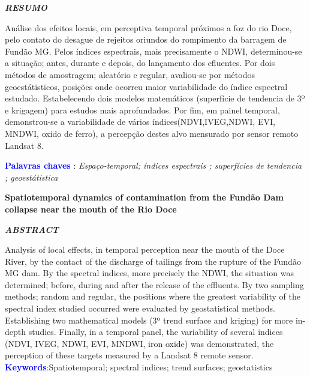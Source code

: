 \begin{center}
	\textbf{\textit{RESUMO}}
\end{center}
\noindent Análise dos efeitos locais, em perceptiva temporal  próximos a foz do rio Doce, pelo contato do desague de rejeitos oriundos do rompimento da barragem de Fundão MG. Pelos índices espectrais, mais precisamente o NDWI, determinou-se  a situação; antes, durante e depois, do lançamento dos efluentes. Por dois métodos de amostragem; aleatório e regular, avaliou-se por métodos geoestátisticos, posições onde ocorreu maior variabilidade do índice espectral estudado. Estabelecendo dois modelos matemáticos (superfície de tendencia de 3º e krigagem) para estudos mais aprofundados. Por fim, em painel temporal, demonstrou-se a variabilidade de vários índices(NDVI,IVEG,NDWI, EVI, MNDWI, oxido de ferro), a percepção destes alvo mensurado por sensor remoto Landsat 8. 

\noindent \textbf{\textcolor{blue}{Palavras chaves}  }:  \textit{ Espaço-temporal; índices espectrais  ;  superfícies de tendencia ; geoestátistica }

\begin{center}
\textbf{Spatiotemporal dynamics of contamination from the Fundão Dam collapse near the mouth of the Rio Doce}
\end{center}
\begin{center}
	\textbf{\textit{ABSTRACT}}
\end{center}
\noindent  
\noindent  Analysis of local effects, in temporal perception near the mouth of the Doce River, by the contact of the discharge of tailings from the rupture of the Fundão MG dam. By the spectral indices, more precisely the NDWI, the situation was determined; before, during and after the release of the effluents. By two sampling methods; random and regular, the positions where the greatest variability of the spectral index studied occurred were evaluated by geostatistical methods. Establishing two mathematical models (3º trend surface and kriging) for more in-depth studies. Finally, in a temporal panel, the variability of several indices (NDVI, IVEG, NDWI, EVI, MNDWI, iron oxide) was demonstrated, the perception of these targets measured by a Landsat 8 remote sensor.
\noindent\textbf{\textcolor{blue}{ Keywords}}:Spatiotemporal; spectral indices; trend surfaces; geostatistics 

\begin{comment}
	\cite{Anderson}
	\cite{Anderson}\\
	\citep{Anderson}\\
	\citet{Anderson}\\
	\citealp{Anderson}, \\
	\citealt{Anderson}, \\
	\citeauthor{Anderson}, \\
	\citeyear{Anderson}, \\
	\citeyearpar{Anderson}, \\
	\citeauthor*{Anderson}, \\
	\citep*{Anderson}, \\
	\citet*{Tanimoto}
\end{comment}
 